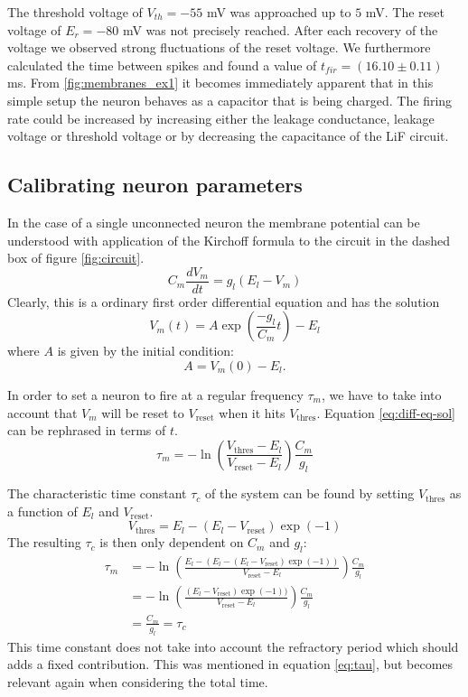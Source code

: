 \documentclass[a4paper,twocolumn]{article}
\begin{document}
The threshold voltage of $V_{th} = -55$ mV was approached up to $5$ mV.  The
reset voltage of $E_r = -80$ mV was not precisely reached.  After each recovery
of the voltage we observed strong fluctuations of the reset voltage.  We
furthermore calculated the time between spikes and found a value of
$t_{fir} = (16.10\pm 0.11)$ ms.  From \ref{fig:membranes_ex1} it becomes immediately
apparent that in this simple setup the neuron behaves as a capacitor that is
being charged.  The firing rate could be increased by increasing either the
leakage conductance,  leakage voltage or threshold voltage or by decreasing
the capacitance of the LiF circuit.

\subsection{Calibrating neuron parameters}

In the case of a single unconnected neuron the membrane potential can be
understood with application of the Kirchoff formula to the circuit in the dashed
box of figure \ref{fig:circuit}.
\[
    C_m \frac{dV_m}{dt} = g_l(E_l - V_m)
\]
Clearly, this is a ordinary first order differential equation and has the
solution
\begin{equation}
    V_m(t) = A \exp(\frac{-g_l}{C_m}t) - E_l
    \label{eq:diff-eq-sol}
\end{equation}
where $A$ is given by the initial condition:
\[
    A = V_m(0) - E_l.
\]

In order to set a neuron to fire at a regular frequency $\tau_m$, we have to take
into account that $V_m$ will be reset to $V_\text{reset}$ when it hits
$V_\text{thres}$. Equation \eqref{eq:diff-eq-sol} can be rephrased in terms of
$t$.
\begin{equation}
    \tau_m = -\ln(\frac{V_\text{thres} - E_l}{V_\text{reset} - E_l})
    \frac{C_m}{g_l}
    \label{eq:tau}
\end{equation}

The characteristic time constant $\tau_c$ of the system can be found by setting
$V_\text{thres}$ as a function of $E_l$ and $V_\text{reset}$.
\[
    V_\text{thres} = E_l - (E_l - V_\text{reset})\exp(-1)
\]
The resulting $\tau_c$ is then only dependent on $C_m$ and $g_l$:
\begin{align*}
    \tau_m &= -\ln(\frac{E_l - (E_l - (E_l - V_\text{reset})\exp(-1))}{V_\text{reset} - E_l}) \frac{C_m}{g_l}\\
           &= -\ln(\frac{(E_l - V_\text{reset})\exp(-1))}{V_\text{reset} - E_l})\frac{C_m}{g_l} \\
           &= \frac{C_m}{g_l} = \tau_c
\end{align*}
This time constant does not take into account the refractory period which should
adds a fixed contribution. This was mentioned in equation \eqref{eq:tau}, but
becomes relevant again when considering the total time.
\end{document}
